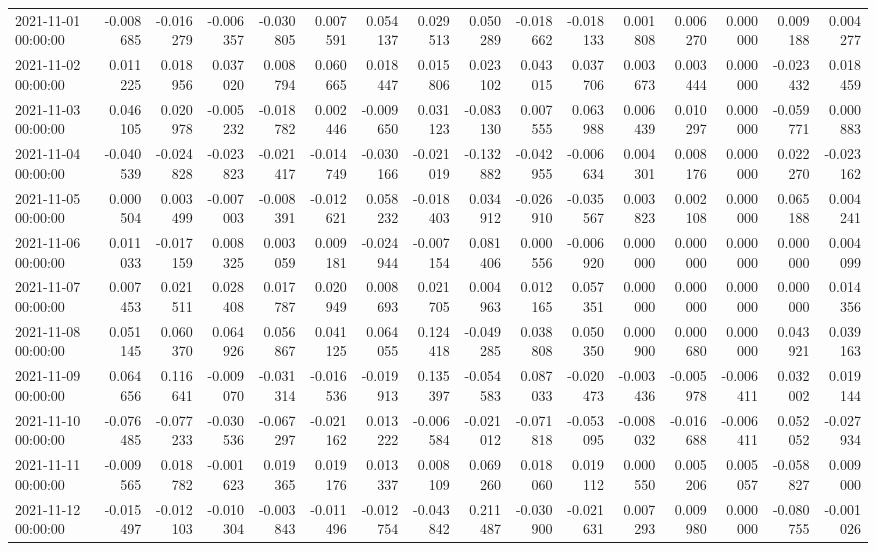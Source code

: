 \begin{tabular}{lrrrrrrrrrrrrrrr}
2021-11-01 00:00:00 & -0.008685 & -0.016279 & -0.006357 & -0.030805 & 0.007591 & 0.054137 & 0.029513 & 0.050289 & -0.018662 & -0.018133 & 0.001808 & 0.006270 & 0.000000 & 0.009188 & 0.004277 \\
2021-11-02 00:00:00 & 0.011225 & 0.018956 & 0.037020 & 0.008794 & 0.060665 & 0.018447 & 0.015806 & 0.023102 & 0.043015 & 0.037706 & 0.003673 & 0.003444 & 0.000000 & -0.023432 & 0.018459 \\
2021-11-03 00:00:00 & 0.046105 & 0.020978 & -0.005232 & -0.018782 & 0.002446 & -0.009650 & 0.031123 & -0.083130 & 0.007555 & 0.063988 & 0.006439 & 0.010297 & 0.000000 & -0.059771 & 0.000883 \\
2021-11-04 00:00:00 & -0.040539 & -0.024828 & -0.023823 & -0.021417 & -0.014749 & -0.030166 & -0.021019 & -0.132882 & -0.042955 & -0.006634 & 0.004301 & 0.008176 & 0.000000 & 0.022270 & -0.023162 \\
2021-11-05 00:00:00 & 0.000504 & 0.003499 & -0.007003 & -0.008391 & -0.012621 & 0.058232 & -0.018403 & 0.034912 & -0.026910 & -0.035567 & 0.003823 & 0.002108 & 0.000000 & 0.065188 & 0.004241 \\
2021-11-06 00:00:00 & 0.011033 & -0.017159 & 0.008325 & 0.003059 & 0.009181 & -0.024944 & -0.007154 & 0.081406 & 0.000556 & -0.006920 & 0.000000 & 0.000000 & 0.000000 & 0.000000 & 0.004099 \\
2021-11-07 00:00:00 & 0.007453 & 0.021511 & 0.028408 & 0.017787 & 0.020949 & 0.008693 & 0.021705 & 0.004963 & 0.012165 & 0.057351 & 0.000000 & 0.000000 & 0.000000 & 0.000000 & 0.014356 \\
2021-11-08 00:00:00 & 0.051145 & 0.060370 & 0.064926 & 0.056867 & 0.041125 & 0.064055 & 0.124418 & -0.049285 & 0.038808 & 0.050350 & 0.000900 & 0.000680 & 0.000000 & 0.043921 & 0.039163 \\
2021-11-09 00:00:00 & 0.064656 & 0.116641 & -0.009070 & -0.031314 & -0.016536 & -0.019913 & 0.135397 & -0.054583 & 0.087033 & -0.020473 & -0.003436 & -0.005978 & -0.006411 & 0.032002 & 0.019144 \\
2021-11-10 00:00:00 & -0.076485 & -0.077233 & -0.030536 & -0.067297 & -0.021162 & 0.013222 & -0.006584 & -0.021012 & -0.071818 & -0.053095 & -0.008032 & -0.016688 & -0.006411 & 0.052052 & -0.027934 \\
2021-11-11 00:00:00 & -0.009565 & 0.018782 & -0.001623 & 0.019365 & 0.019176 & 0.013337 & 0.008109 & 0.069260 & 0.018060 & 0.019112 & 0.000550 & 0.005206 & 0.005057 & -0.058827 & 0.009000 \\
2021-11-12 00:00:00 & -0.015497 & -0.012103 & -0.010304 & -0.003843 & -0.011496 & -0.012754 & -0.043842 & 0.211487 & -0.030900 & -0.021631 & 0.007293 & 0.009980 & 0.000000 & -0.080755 & -0.001026 \\

\end{tabular}
